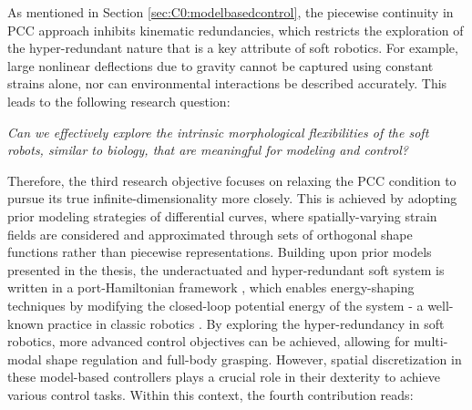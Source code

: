 
As mentioned in Section \ref{sec:C0:modelbasedcontrol}, the piecewise continuity in PCC approach inhibits kinematic redundancies, which restricts the exploration of the hyper-redundant nature that is a key attribute of soft robotics. For example, large nonlinear deflections due to gravity cannot be captured using constant strains alone, nor can environmental interactions be described accurately. This leads to the following research question:
%
\begin{center}
\textit{Can we effectively explore the intrinsic morphological flexibilities of the soft robots, similar to biology, that are meaningful for modeling and control?}
\end{center}
%
Therefore, the third research objective focuses on relaxing the PCC condition to pursue its true infinite-dimensionality more closely. This is achieved by adopting prior modeling strategies of differential curves, where spatially-varying strain fields are considered and approximated through sets of orthogonal shape functions rather than piecewise representations. Building upon prior models presented in the thesis, the underactuated and hyper-redundant soft system is written in a port-Hamiltonian framework \cite{Schaft2004,Ortega2002}, which enables energy-shaping techniques by modifying the closed-loop potential energy of the system - a well-known practice in classic robotics \cite{Schaft2004,Ortega1998,Ortega2002}. By exploring the hyper-redundancy in soft robotics, more advanced control objectives can be achieved, allowing for multi-modal shape regulation and full-body grasping. However, spatial discretization in these model-based controllers plays a crucial role in their dexterity to achieve various control tasks. Within this context, the fourth contribution reads:

 \newpage


